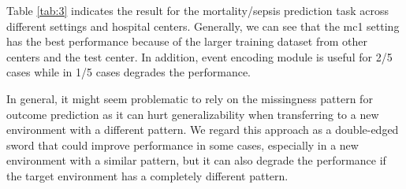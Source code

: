 \documentclass[journal,twoside,web]{ieeecolor}
\begin{document}
Table \ref*{tab:3} indicates the result for the mortality/sepsis prediction task across different settings and hospital centers. Generally, we can see that the mc1 setting has the best performance because of the larger training dataset from other centers and the test center. In addition, event encoding module is useful for 2/5 cases while in 1/5 cases degrades the performance.

In general, it might seem problematic to rely on the missingness pattern for outcome prediction as it can hurt generalizability when transferring to a new environment with a different pattern. We regard this approach as a double-edged sword that could improve performance in some cases, especially in a new environment with a similar pattern, but it can also degrade the performance if the target environment has a completely different pattern.
\end{document}
